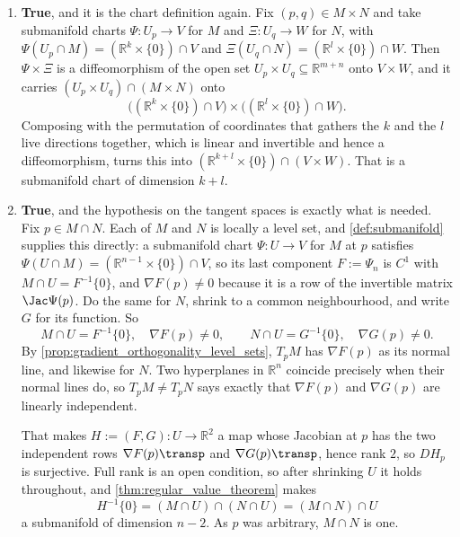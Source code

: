 \begin{exercisesolution}
\begin{enumerate}[label=\textbf{(\alph*)}]
    What goes wrong is that disjointness is not enough: the two pieces are disjoint but one of
    them accumulates on the other. Requiring instead that $M$ and $N$ have disjoint
    \emph{closures} makes the statement true, and then each point of the union has a
    neighbourhood meeting only one of the two.
  \item \textbf{True}, and it is the chart definition again. Fix $(p,q) \in M \times N$ and take
    submanifold charts $\Psi : U_p \to V$ for $M$ and $\Xi : U_q \to W$ for $N$, with
    $\Psi(U_p \cap M) = (\mathbb{R}^k\times\{0\})\cap V$ and
    $\Xi(U_q \cap N) = (\mathbb{R}^l\times\{0\})\cap W$. Then $\Psi\times\Xi$ is a
    diffeomorphism of the open set $U_p\times U_q \subseteq \mathbb{R}^{m+n}$ onto $V\times W$,
    and it carries $(U_p\times U_q) \cap (M\times N)$ onto
    \[\big((\mathbb{R}^k\times\{0\})\cap V\big) \times \big((\mathbb{R}^l\times\{0\})\cap W\big).\]
    Composing with the permutation of coordinates that gathers the $k$ and the $l$ live
    directions together, which is linear and invertible and hence a diffeomorphism, turns this
    into $(\mathbb{R}^{k+l}\times\{0\}) \cap (V\times W)$. That is a submanifold chart of
    dimension $k+l$.
  \item \textbf{True}, and the hypothesis on the tangent spaces is exactly what is needed. Fix
    $p \in M \cap N$. Each of $M$ and $N$ is locally a level set, and \cref{def:submanifold}
    supplies this directly: a submanifold chart $\Psi : U \to V$ for $M$ at $p$ satisfies
    $\Psi(U \cap M) = (\mathbb{R}^{n-1}\times\{0\}) \cap V$, so its last component
    $F := \Psi_n$ is $C^1$ with $M \cap U = F^{-1}\{0\}$, and $\nabla F(p) \neq 0$ because it is
    a row of the invertible matrix $\Jac\Psi(p)$. Do the same for $N$, shrink to a common
    neighbourhood, and write $G$ for its function. So
    \[M \cap U = F^{-1}\{0\}, \quad \nabla F(p) \neq 0, \qquad
      N \cap U = G^{-1}\{0\}, \quad \nabla G(p) \neq 0 .\]
    By \cref{prop:gradient_orthogonality_level_sets}, $T_pM$ has $\nabla F(p)$ as its
    normal line, and likewise for $N$. Two hyperplanes in $\mathbb{R}^n$ coincide precisely when
    their normal lines do, so $T_pM \neq T_pN$ says exactly that $\nabla F(p)$ and $\nabla G(p)$
    are linearly independent.

    That makes $H := (F,G) : U \to \mathbb{R}^2$ a map whose Jacobian at $p$ has the two
    independent rows $\nabla F(p)\transp$ and $\nabla G(p)\transp$, hence rank $2$, so $DH_p$ is
    surjective. Full rank is an open condition, so after shrinking $U$ it holds throughout, and
    \cref{thm:regular_value_theorem} makes
    \[H^{-1}\{0\} = (M\cap U) \cap (N \cap U) = (M\cap N)\cap U\]
    a submanifold of dimension $n-2$. As $p$ was arbitrary, $M \cap N$ is one.
\end{enumerate}


\end{exercisesolution}
